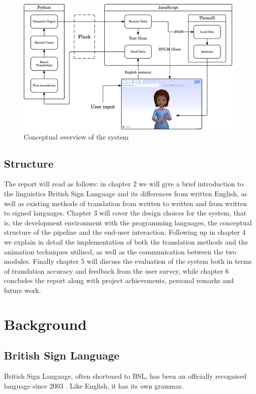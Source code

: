 \documentclass[12pt]{ociamthesis}  %
\begin{document}
\begin{figure}[h]
	\centering
    \includegraphics[scale=0.7]{BSL-cropped.pdf}
    \caption{Conceptual overview of the system}
    \label{fig:sys-overview}
\end{figure}

\section{Structure}
The report will read as follows: in chapter 2 we will give a brief introduction to the linguistics British Sign Language and its differences from written English, as well as existing methods of translation from written to written and from written to signed languages. Chapter 3 will cover the design choices for the system, that is, the development environment with the programming languages, the conceptual structure of the pipeline and the end-user interaction. Following up in chapter 4 we explain in detail the implementation of both the translation methods and the animation techniques utilised, as well as the communication between the two modules. Finally chapter 5 will discuss the evaluation of the system both in terms of translation accuracy and feedback from the user survey, while chapter 6 concludes the report along with project achievements, personal remarks and future work.


\chapter{Background}
\section{British Sign Language}
British Sign Language, often shortened to BSL, has been an officially recognised language since 2003 . Like English, it has its own grammar.
 
\end{document}
